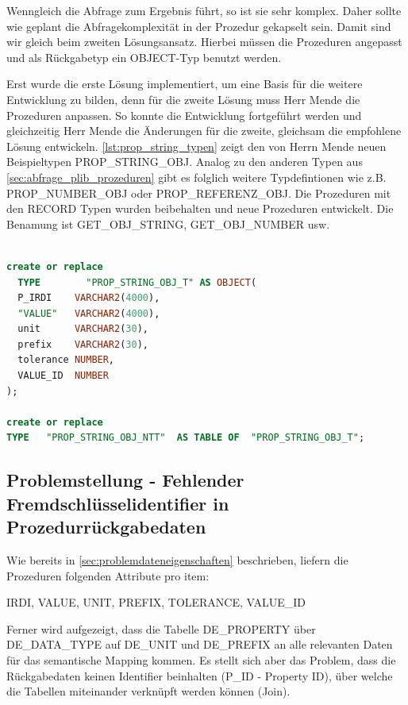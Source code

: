 Wenngleich die Abfrage zum Ergebnis führt, so ist sie sehr komplex. Daher sollte wie geplant die Abfragekomplexität in der Prozedur gekapselt sein. Damit sind wir gleich beim zweiten Lösungsansatz. Hierbei müssen die Prozeduren angepasst und als Rückgabetyp ein OBJECT-Typ benutzt werden. 

Erst wurde die erste Lösung implementiert, um eine Basis für die weitere Entwicklung zu bilden, denn für die zweite Lösung muss Herr Mende die Prozeduren anpassen. So konnte die Entwicklung fortgeführt werden und gleichzeitig Herr Mende die Änderungen für die zweite, gleichsam die empfohlene Lösung entwickeln. \autoref{lst:prop_string_typen} zeigt den von Herrn Mende neuen Beispieltypen PROP\_STRING\_OBJ. Analog zu den anderen Typen aus \autoref{sec:abfrage_plib_prozeduren} gibt es folglich weitere Typdefintionen wie z.B. PROP\_NUMBER\_OBJ oder PROP\_REFERENZ\_OBJ. 
Die Prozeduren mit den RECORD Typen wurden beibehalten und neue Prozeduren entwickelt. Die Benamung ist GET\_OBJ\_STRING, GET\_OBJ\_NUMBER usw.
\\~
\begin{lstlisting}[caption=PROP\_STRING\_OBJ Typen, language=sql, label=lst:prop_string_typen]
create or replace
  TYPE        "PROP_STRING_OBJ_T" AS OBJECT(
  P_IRDI    VARCHAR2(4000),
  "VALUE"   VARCHAR2(4000),
  unit      VARCHAR2(30),
  prefix    VARCHAR2(30),
  tolerance NUMBER,
  VALUE_ID  NUMBER
);

create or replace
TYPE   "PROP_STRING_OBJ_NTT"  AS TABLE OF  "PROP_STRING_OBJ_T";
\end{lstlisting}

\subsection{Problemstellung - Fehlender Fremdschlüsselidentifier in Prozedurrückgabedaten}

Wie bereits in \autoref{sec:problemdateneigenschaften} beschrieben, liefern die Prozeduren folgenden Attribute pro \gls{item}: 

IRDI, VALUE, UNIT, PREFIX, TOLERANCE, VALUE\_ID

Ferner wird aufgezeigt, dass die Tabelle DE\_PROPERTY über DE\_DATA\_TYPE auf DE\_UNIT und DE\_PREFIX an alle relevanten Daten für das semantische Mapping kommen. Es stellt sich aber das Problem, dass die Rückgabedaten keinen Identifier beinhalten (P\_ID - Property ID), über welche die Tabellen miteinander verknüpft werden können (Join). 
 
